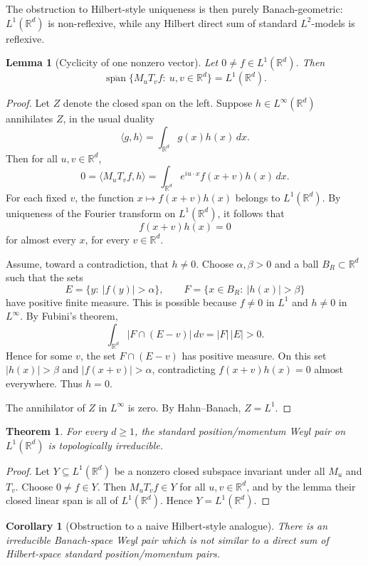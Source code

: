 \documentclass[11pt]{article}
\newtheorem{theorem}{Theorem}
\newtheorem{lemma}{Lemma}
\newtheorem{corollary}{Corollary}
\newcommand{\R}{\mathbb R}
\newcommand{\spn}{\operatorname{span}}
\begin{document}
The obstruction to Hilbert-style uniqueness is then purely Banach-geometric:
\(L^1(\R^d)\) is non-reflexive, while any Hilbert direct sum of standard
\(L^2\)-models is reflexive.

\begin{lemma}[Cyclicity of one nonzero vector]
Let \(0\ne f\in L^1(\R^d)\). Then
\[
  \overline{\spn}\{M_uT_vf:\ u,v\in\R^d\}=L^1(\R^d).
\]
\end{lemma}

\begin{proof}
Let \(Z\) denote the closed span on the left. Suppose \(h\in L^\infty(\R^d)\)
annihilates \(Z\), in the usual duality
\[
  \langle g,h\rangle=\int_{\R^d}g(x)h(x)\,dx.
\]
Then for all \(u,v\in\R^d\),
\[
  0=\langle M_uT_vf,h\rangle
   =\int_{\R^d} e^{iu\cdot x} f(x+v)h(x)\,dx.
\]
For each fixed \(v\), the function \(x\mapsto f(x+v)h(x)\) belongs to
\(L^1(\R^d)\). By uniqueness of the Fourier transform on \(L^1(\R^d)\), it
follows that
\[
  f(x+v)h(x)=0
\]
for almost every \(x\), for every \(v\in\R^d\).

Assume, toward a contradiction, that \(h\ne0\). Choose \(\alpha,\beta>0\) and
a ball \(B_R\subset\R^d\) such that the sets
\[
  E=\{y:\ |f(y)|>\alpha\},\qquad
  F=\{x\in B_R:\ |h(x)|>\beta\}
\]
have positive finite measure. This is possible because \(f\ne0\) in \(L^1\)
and \(h\ne0\) in \(L^\infty\). By Fubini's theorem,
\[
  \int_{\R^d} |F\cap(E-v)|\,dv=|F|\,|E|>0.
\]
Hence for some \(v\), the set \(F\cap(E-v)\) has positive measure. On this set
\(|h(x)|>\beta\) and \(|f(x+v)|>\alpha\), contradicting
\(f(x+v)h(x)=0\) almost everywhere. Thus \(h=0\).

The annihilator of \(Z\) in \(L^\infty\) is zero. By Hahn--Banach, \(Z=L^1\).
\end{proof}

\begin{theorem}
For every \(d\ge1\), the standard position/momentum Weyl pair on
\(L^1(\R^d)\) is topologically irreducible.
\end{theorem}

\begin{proof}
Let \(Y\subseteq L^1(\R^d)\) be a nonzero closed subspace invariant under all
\(M_u\) and \(T_v\). Choose \(0\ne f\in Y\). Then \(M_uT_vf\in Y\) for all
\(u,v\in\R^d\), and by the lemma their closed linear span is all of
\(L^1(\R^d)\). Hence \(Y=L^1(\R^d)\).
\end{proof}

\begin{corollary}[Obstruction to a naive Hilbert-style analogue]
There is an irreducible Banach-space Weyl pair which is not similar to a direct
sum of Hilbert-space standard position/momentum pairs.
\end{corollary}
\end{document}
